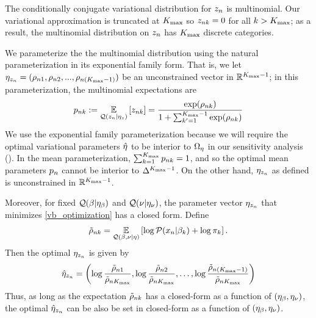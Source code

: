 \begin{ex}
%
The conditionally conjugate variational distribution for $z_n$
is multinomial.
Our variational approximation is truncated at ${K_{\mathrm{max}}}$ so
$z_{nk} = 0$ for all $k > {K_{\mathrm{max}}}$;
as a result,
the multinomial distribution on $z_n$ has ${K_{\mathrm{max}}}$ discrete categories.


We parameterize the the multinomial distribution using the natural parameterization
in its exponential family form. That is,
we let $\eta_{z_n} = (\rho_{n1}, \rho_{n2}, ..., \rho_{n({K_{\mathrm{max}}}-1)})$
be an unconstrained vector in $\mathbb{R}^{{K_{\mathrm{max}}}-1}$;
in this parameterization, the multinomial expectations are
%
\begin{align*}
  p_{nk} := \underset{\mathcal{Q}(z_n \vert \eta_{z})}{\mathbb{E}}\left[z_{nk}\right] =
  \frac{\exp(\rho_{nk})}{1 + \sum_{k'=1}^{{K_{\mathrm{max}}}-1}\exp(\rho_{nk})}
\end{align*}
%
We use the exponential family parameterization because
we will require the optimal variational parameters $\hat\eta$
to be interior to $\Omega_{\eta}$ in our sensitivity analysis
().
In the mean parameterization,
$\sum_{k=1}^{K_{\mathrm{max}}} p_{nk} = 1$, and so the
optimal mean parameters $p_{n}$ cannot be
interior to $\Delta^{{K_{\mathrm{max}}} - 1}$.
On the other hand, $\eta_{z_n}$ as defined
is unconstrained in $\mathbb{R}^{{K_{\mathrm{max}}} - 1}$.

Moreover, for fixed $\mathcal{Q}(\beta\vert\eta_{\beta})$ and $\mathcal{Q}(\nu\vert\eta_{\nu})$,
the parameter vector $\eta_{z_n}$ that minimizes \eqref{vb_optimization}
has a closed form. Define
%
\begin{align*}
\tilde \rho_{nk} = \underset{\mathcal{Q}(\beta, \nu \vert \eta)}{\mathbb{E}}\left[\log \mathcal{P}(x_n \vert \beta_k) + \log \pi_k\right].
\end{align*}
%
Then the optimal $\eta_{z_n}$ is given by
%
\begin{align*}
%
\etaopt_{\z_\n} = \left(\log\frac{\tilde\rho_{\n1}}{\tilde\rho_{\n\kmax}},
\log\frac{\tilde\rho_{\n2}}{\tilde\rho_{\n\kmax}}, \ldots,
\log\frac{\tilde\rho_{\n(\kmax-1)}}{\tilde\rho_{\n\kmax}}\right)
%
\end{align*}
%
Thus, as long as the expectation $\tilde\rho_{nk}$ has a closed-form as a function of
$(\eta_{\beta}, \eta_{\nu})$, the optimal $\hat\eta_{z_n}$ can be also be set in closed-form as
a function of $(\eta_{\beta}, \eta_{\nu})$.
%
\end{ex}

